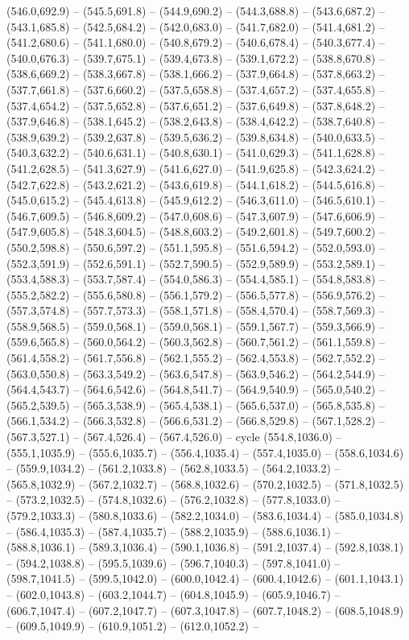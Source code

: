 (546.0,692.9) -- (545.5,691.8) -- (544.9,690.2) -- (544.3,688.8) -- (543.6,687.2) -- (543.1,685.8) -- (542.5,684.2) -- (542.0,683.0) -- (541.7,682.0) -- (541.4,681.2) -- (541.2,680.6) -- (541.1,680.0) -- (540.8,679.2) -- (540.6,678.4) -- (540.3,677.4) -- (540.0,676.3) -- (539.7,675.1) -- (539.4,673.8) -- (539.1,672.2) -- (538.8,670.8) -- (538.6,669.2) -- (538.3,667.8) -- (538.1,666.2) -- (537.9,664.8) -- (537.8,663.2) -- (537.7,661.8) -- (537.6,660.2) -- (537.5,658.8) -- (537.4,657.2) -- (537.4,655.8) -- (537.4,654.2) -- (537.5,652.8) -- (537.6,651.2) -- (537.6,649.8) -- (537.8,648.2) -- (537.9,646.8) -- (538.1,645.2) -- (538.2,643.8) -- (538.4,642.2) -- (538.7,640.8) -- (538.9,639.2) -- (539.2,637.8) -- (539.5,636.2) -- (539.8,634.8) -- (540.0,633.5) -- (540.3,632.2) -- (540.6,631.1) -- (540.8,630.1) -- (541.0,629.3) -- (541.1,628.8) -- (541.2,628.5) -- (541.3,627.9) -- (541.6,627.0) -- (541.9,625.8) -- (542.3,624.2) -- (542.7,622.8) -- (543.2,621.2) -- (543.6,619.8) -- (544.1,618.2) -- (544.5,616.8) -- (545.0,615.2) -- (545.4,613.8) -- (545.9,612.2) -- (546.3,611.0) -- (546.5,610.1) -- (546.7,609.5) -- (546.8,609.2) -- (547.0,608.6) -- (547.3,607.9) -- (547.6,606.9) -- (547.9,605.8) -- (548.3,604.5) -- (548.8,603.2) -- (549.2,601.8) -- (549.7,600.2) -- (550.2,598.8) -- (550.6,597.2) -- (551.1,595.8) -- (551.6,594.2) -- (552.0,593.0) -- (552.3,591.9) -- (552.6,591.1) -- (552.7,590.5) -- (552.9,589.9) -- (553.2,589.1) -- (553.4,588.3) -- (553.7,587.4) -- (554.0,586.3) -- (554.4,585.1) -- (554.8,583.8) -- (555.2,582.2) -- (555.6,580.8) -- (556.1,579.2) -- (556.5,577.8) -- (556.9,576.2) -- (557.3,574.8) -- (557.7,573.3) -- (558.1,571.8) -- (558.4,570.4) -- (558.7,569.3) -- (558.9,568.5) -- (559.0,568.1) -- (559.0,568.1) -- (559.1,567.7) -- (559.3,566.9) -- (559.6,565.8) -- (560.0,564.2) -- (560.3,562.8) -- (560.7,561.2) -- (561.1,559.8) -- (561.4,558.2) -- (561.7,556.8) -- (562.1,555.2) -- (562.4,553.8) -- (562.7,552.2) -- (563.0,550.8) -- (563.3,549.2) -- (563.6,547.8) -- (563.9,546.2) -- (564.2,544.9) -- (564.4,543.7) -- (564.6,542.6) -- (564.8,541.7) -- (564.9,540.9) -- (565.0,540.2) -- (565.2,539.5) -- (565.3,538.9) -- (565.4,538.1) -- (565.6,537.0) -- (565.8,535.8) -- (566.1,534.2) -- (566.3,532.8) -- (566.6,531.2) -- (566.8,529.8) -- (567.1,528.2) -- (567.3,527.1) -- (567.4,526.4) -- (567.4,526.0) -- cycle  (554.8,1036.0) -- (555.1,1035.9) -- (555.6,1035.7) -- (556.4,1035.4) -- (557.4,1035.0) -- (558.6,1034.6) -- (559.9,1034.2) -- (561.2,1033.8) -- (562.8,1033.5) -- (564.2,1033.2) -- (565.8,1032.9) -- (567.2,1032.7) -- (568.8,1032.6) -- (570.2,1032.5) -- (571.8,1032.5) -- (573.2,1032.5) -- (574.8,1032.6) -- (576.2,1032.8) -- (577.8,1033.0) -- (579.2,1033.3) -- (580.8,1033.6) -- (582.2,1034.0) -- (583.6,1034.4) -- (585.0,1034.8) -- (586.4,1035.3) -- (587.4,1035.7) -- (588.2,1035.9) -- (588.6,1036.1) -- (588.8,1036.1) -- (589.3,1036.4) -- (590.1,1036.8) -- (591.2,1037.4) -- (592.8,1038.1) -- (594.2,1038.8) -- (595.5,1039.6) -- (596.7,1040.3) -- (597.8,1041.0) -- (598.7,1041.5) -- (599.5,1042.0) -- (600.0,1042.4) -- (600.4,1042.6) -- (601.1,1043.1) -- (602.0,1043.8) -- (603.2,1044.7) -- (604.8,1045.9) -- (605.9,1046.7) -- (606.7,1047.4) -- (607.2,1047.7) -- (607.3,1047.8) -- (607.7,1048.2) -- (608.5,1048.9) -- (609.5,1049.9) -- (610.9,1051.2) -- (612.0,1052.2) -- 